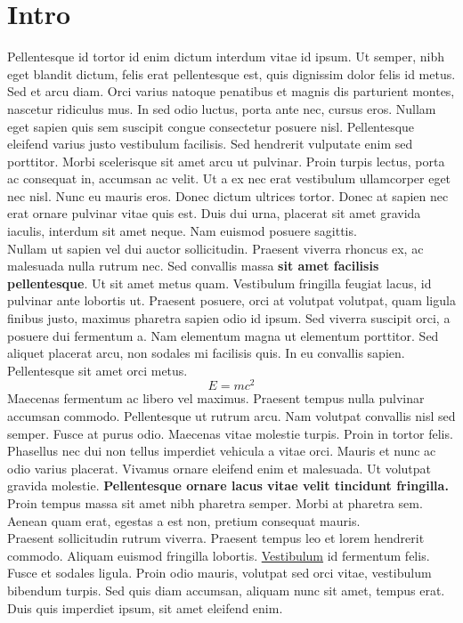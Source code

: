 \documentclass[12pt,a4paper]{article}
\begin{document}
	\section{Intro}
	Pellentesque id tortor id enim dictum interdum vitae id ipsum. Ut semper, nibh eget blandit dictum, felis erat pellentesque est, quis dignissim dolor felis id metus. Sed et arcu diam. Orci varius natoque penatibus et magnis dis parturient montes, nascetur ridiculus mus. In sed odio luctus, porta ante nec, cursus eros. Nullam eget sapien quis sem suscipit congue consectetur posuere nisl. Pellentesque eleifend varius justo vestibulum facilisis. Sed hendrerit vulputate enim sed porttitor. Morbi scelerisque sit amet arcu ut pulvinar. Proin turpis lectus, porta ac consequat in, accumsan ac velit. Ut a ex nec erat vestibulum ullamcorper eget nec nisl. Nunc eu mauris eros. Donec dictum ultrices tortor. Donec at sapien nec erat ornare pulvinar vitae quis est. Duis dui urna, placerat sit amet gravida iaculis, interdum sit amet neque. Nam euismod posuere sagittis. \\Nullam ut sapien vel dui auctor sollicitudin. Praesent viverra rhoncus ex, ac malesuada nulla rutrum nec. Sed convallis massa \textbf{sit amet facilisis pellentesque}. Ut sit amet metus quam. Vestibulum fringilla feugiat lacus, id pulvinar ante lobortis ut. Praesent posuere, orci at volutpat volutpat, quam ligula finibus justo, maximus pharetra sapien odio id ipsum. Sed viverra suscipit orci, a posuere dui fermentum a. Nam elementum magna ut elementum porttitor. Sed aliquet placerat arcu, non sodales mi facilisis quis. In eu convallis sapien. Pellentesque sit amet orci metus. 
	\[E=mc^2\]
	Maecenas fermentum ac libero vel maximus. Praesent tempus nulla pulvinar accumsan commodo. Pellentesque ut rutrum arcu. Nam volutpat convallis nisl sed semper. Fusce at purus odio. Maecenas vitae molestie turpis. Proin in tortor felis. Phasellus nec dui non tellus imperdiet vehicula a vitae orci. Mauris et nunc ac odio varius placerat. Vivamus ornare eleifend enim et malesuada. Ut volutpat gravida molestie. \textbf{Pellentesque ornare lacus vitae velit tincidunt fringilla.}  Proin tempus massa sit amet nibh pharetra semper. Morbi at pharetra sem. Aenean quam erat, egestas a est non, pretium consequat mauris. \\Praesent sollicitudin rutrum viverra. Praesent tempus leo et lorem hendrerit commodo. Aliquam euismod fringilla lobortis. \underline{Vestibulum} id fermentum felis. Fusce et sodales ligula. Proin odio mauris, volutpat sed orci vitae, vestibulum bibendum turpis. Sed quis diam accumsan, aliquam nunc sit amet, tempus erat. Duis quis imperdiet ipsum, sit amet eleifend enim. 
\end{document}
